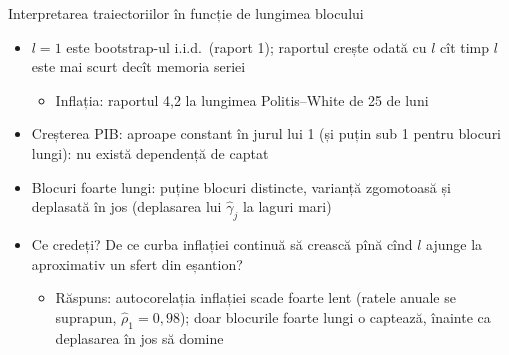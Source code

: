\begin{frame}{Interpretarea traiectoriilor în funcție de lungimea blocului}
\itemsize{\small}
\begin{itemize}
    \item $l = 1$ este bootstrap-ul i.i.d.\ (raport 1); raportul crește odată cu $l$ cît timp $l$ este mai scurt decît memoria seriei
    \begin{itemize}
        \item Inflația: raportul 4{,}2 la lungimea Politis--White de 25 de luni
    \end{itemize}
    \item Creșterea PIB: aproape constant în jurul lui 1 (și puțin sub 1 pentru blocuri lungi): nu există dependență de captat
    \item Blocuri foarte lungi: puține blocuri distincte, varianță zgomotoasă și deplasată în jos (deplasarea lui $\hat\gamma_j$ la laguri mari)
    \item Ce credeți? De ce curba inflației continuă să crească pînă cînd $l$ ajunge la aproximativ un sfert din eșantion?
    \begin{itemize}
        \item Răspuns: autocorelația inflației scade foarte lent (ratele anuale se suprapun, $\hat\rho_1 = 0{,}98$); doar blocurile foarte lungi o captează, înainte ca deplasarea în jos să domine
    \end{itemize}
\end{itemize}
\end{frame}

